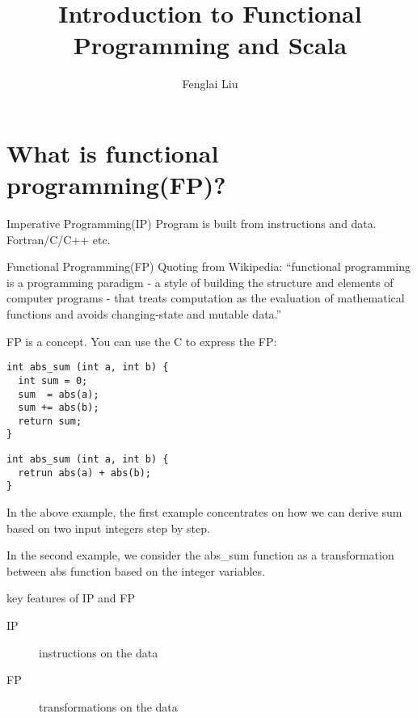\documentclass[notheorems, aspectratio=54]{beamer}
\title[Introduction to Functional Programming and Scala]{Introduction to Functional Programming and Scala}
\author{Fenglai Liu}
\institute[ACCRE]{fenglai@accre.vanderbilt.edu}
\begin{document}
\begin{frame}
    \titlepage
\end{frame}


\section{What is functional programming(FP)?}
\begin{frame}

\begin{block}{Imperative Programming(IP)}
Program is built from instructions and data. Fortran/C/C++ etc.
\end{block}

\begin{block}{Functional Programming(FP)}
Quoting from Wikipedia: ``functional programming is a programming 
paradigm - a style of building the structure and elements of computer 
programs - that treats computation as the evaluation of mathematical 
functions and avoids changing-state and mutable data.''
\end{block}

\end{frame}

\begin{frame}[fragile]

FP is a concept. You can use the C to express the FP:

\begin{verbatim}
int abs_sum (int a, int b) {
  int sum = 0;
  sum  = abs(a);
  sum += abs(b);
  return sum;
}
\end{verbatim}

\begin{verbatim}
int abs_sum (int a, int b) {
  retrun abs(a) + abs(b);
}
\end{verbatim}

In the above example, the first example concentrates on how we can derive sum based 
on two input integers step by step. 

In the second example, we consider the abs\_sum function as a transformation between 
abs function based on the integer variables. 

\begin{block}{key features of IP and FP}
 \begin{description}
 \item [IP] instructions on the data
 \item [FP] transformations on the data
\end{description}
\end{block}

\end{frame}
\end{document}
